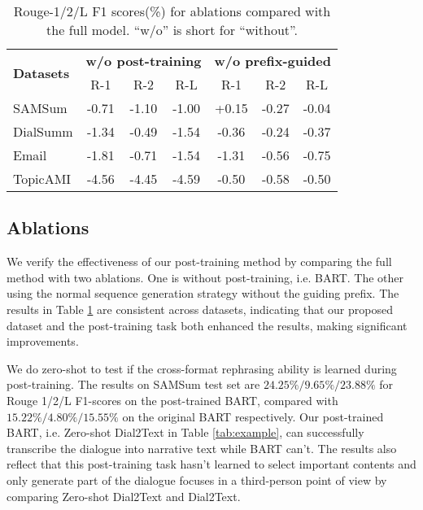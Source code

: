 \begin{table}
	\centering
	\small
	\begin{tabular}{lcccccc}
	\toprule[1pt]
	 \multirow{2}{0.7pt}{\textbf{Datasets}}& \multicolumn{3}{c}{\textbf{w/o post-training}}& \multicolumn{3}{c}{\textbf{w/o prefix-guided} }\\

	& R-1 & R-2 & R-L& R-1 & R-2 & R-L \\
	\midrule[1pt]
	SAMSum & -0.71&-1.10&-1.00 & +0.15&-0.27&-0.04 \\
	DialSumm & -1.34&-0.49&-1.54 & -0.36&-0.24&-0.37 \\
	Email & -1.81&-0.71&-1.54 & -1.31&-0.56&-0.75 \\
	TopicAMI & -4.56&-4.45&-4.59 & -0.50&-0.58&-0.50\\
	\bottomrule[1pt]
	\end{tabular}
	\caption{Rouge-1/2/L F1 scores(\%) for ablations compared with the full model. ``w/o'' is short for ``without''.}
	\label{tab:ablation}
\end{table}


\subsection{Ablations}\label{sec:ablations}



We verify the effectiveness of our post-training method by comparing the full method with two ablations. One is without post-training, i.e. BART. The other using the normal sequence generation strategy without the guiding prefix.%
The results in Table \ref{tab:ablation} are consistent across datasets, indicating that our proposed dataset and the post-training task both enhanced the results, making significant improvements.

 We do zero-shot to test if the cross-format rephrasing ability is learned during post-training. The results on SAMSum test set are $24.25\%/9.65\%/ 23.88\%$ for Rouge 1/2/L F1-scores on the post-trained BART, compared with $15.22\%/4.80\%/15.55\%$ on the original BART respectively. Our post-trained BART, i.e. Zero-shot Dial2Text in Table \ref{tab:example}, can successfully transcribe the dialogue into narrative text while BART can't. %
The results also reflect that this post-training task hasn't learned to select important contents and only generate part of the dialogue focuses in a third-person point of view by comparing Zero-shot Dial2Text and Dial2Text.

